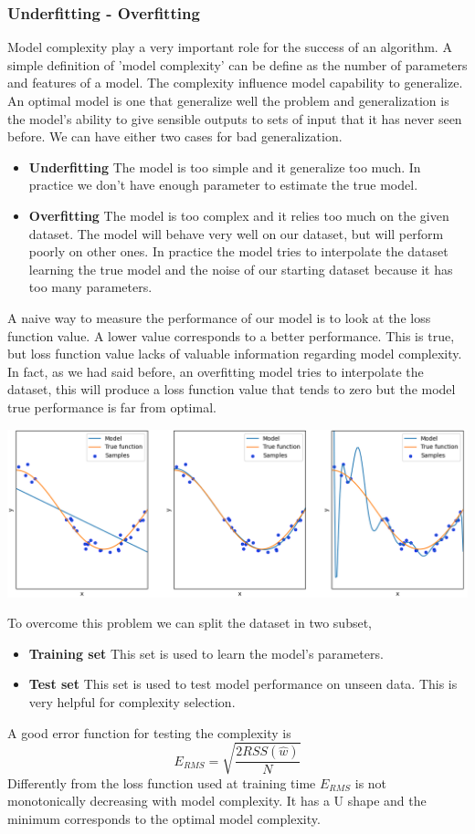 \documentclass[main.tex]{subfiles}
\begin{document}
\subsubsection{Underfitting - Overfitting} \label{fitting}
Model complexity play a very important role for the success of an algorithm. A simple definition of 'model complexity' can be define as the number of parameters and features of a model. The complexity influence model capability to generalize.
An optimal model is one that generalize well the problem and generalization is the model’s ability to give sensible outputs to sets of input that it has never seen before. We can have either two cases for bad generalization.
\begin{itemize}
    \item \textbf{Underfitting} The model is too simple and it generalize too much. In practice we don't have enough parameter to estimate the true model.
    \item \textbf{Overfitting} The model is too complex and it relies too much on the given dataset. The model will behave very well on our dataset, but will perform poorly on other ones. In practice the model tries to interpolate the dataset learning the true model and the noise of our starting dataset because it has too many parameters.
\end{itemize}
A naive way to measure the performance of our model is to look at the loss function value. A lower value corresponds to a better performance. This is true, but loss function value lacks of valuable information regarding model complexity. In fact, as we had said before, an overfitting model tries to interpolate the dataset, this will produce a loss function value that tends to zero but the model true performance is far from optimal.
\begin{center}
    \includegraphics[scale=0.5]{img/Under-Overfitting.png}
\end{center}
To overcome this problem we can split the dataset in two subset,
\begin{itemize}
    \item \textbf{Training set} This set is used to learn the model's parameters.
    \item \textbf{Test set} This set is used to test model performance on unseen data. This is very helpful for complexity selection.
\end{itemize}
A good error function for testing the complexity is
\begin{equation}
    E_{RMS}=\sqrt{\frac{2RSS(\hat{w})}{N}}
\end{equation}
Differently from the loss function used at training time $E_{RMS}$ is not monotonically decreasing with model complexity. It has a U shape and the minimum corresponds to the optimal model complexity.
\end{document}
